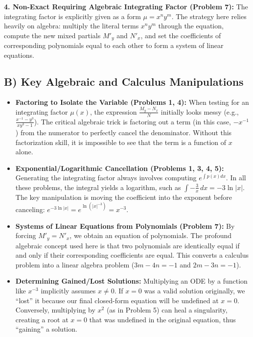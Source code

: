 \documentclass[11pt]{article}
\begin{document}
\textbf{4. Non-Exact Requiring Algebraic Integrating Factor (Problem 7):} The integrating factor is explicitly given as a form $\mu = x^n y^m$. The strategy here relies heavily on algebra: multiply the literal terms $x^n y^m$ through the equation, compute the new mixed partials $M'_y$ and $N'_x$, and set the coefficients of corresponding polynomials equal to each other to form a system of linear equations.

\subsection*{B) Key Algebraic and Calculus Manipulations}
\begin{itemize}
    \item \textbf{Factoring to Isolate the Variable (Problems 1, 4):} When testing for an integrating factor $\mu(x)$, the expression $\frac{M_y - N_x}{N}$ initially looks messy (e.g., $\frac{x^{-1} - y^3}{xy^3 - 1}$). The critical algebraic trick is factoring out a term (in this case, $-x^{-1}$) from the numerator to perfectly cancel the denominator. Without this factorization skill, it is impossible to see that the term is a function of $x$ alone.
    
    \item \textbf{Exponential/Logarithmic Cancellation (Problems 1, 3, 4, 5):} Generating the integrating factor always involves computing $e^{\int p(x)dx}$. In all these problems, the integral yields a logarithm, such as $\int -\frac{3}{x} \, dx = -3\ln|x|$. The key manipulation is moving the coefficient into the exponent before canceling: $e^{-3\ln|x|} = e^{\ln(|x|^{-3})} = x^{-3}$.
    
    \item \textbf{Systems of Linear Equations from Polynomials (Problem 7):} By forcing $M'_y = N'_x$, we obtain an equation of polynomials. The profound algebraic concept used here is that two polynomials are identically equal if and only if their corresponding coefficients are equal. This converts a calculus problem into a linear algebra problem ($3m - 4n = -1$ and $2m - 3n = -1$).
    
    \item \textbf{Determining Gained/Lost Solutions:} Multiplying an ODE by a function like $x^{-3}$ implicitly assumes $x \neq 0$. If $x = 0$ was a valid solution originally, we ``lost'' it because our final closed-form equation will be undefined at $x = 0$. Conversely, multiplying by $x^2$ (as in Problem 5) can heal a singularity, creating a root at $x = 0$ that was undefined in the original equation, thus ``gaining'' a solution.
\end{itemize}
\end{document}
